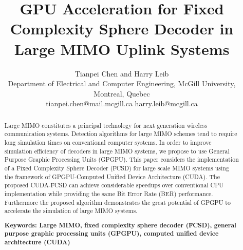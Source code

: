 \documentclass[letterpaper, 10pt, conference]{ieeeconf}
\title{\LARGE \bf GPU Acceleration for Fixed Complexity Sphere Decoder in Large MIMO Uplink Systems}
\author{Tianpei Chen and Harry Leib\\
Department of Electrical and Computer Engineering, McGill University, Montreal, Quebec\\
tianpei.chen@mail.mcgill.ca harry.leib@mcgill.ca}
\begin{document}
\maketitle
\thispagestyle{fancy} %
\lhead{} %
\chead{} %
\rhead{\thepage} %
\lfoot{} %
\cfoot{} %
\rfoot{} %
\renewcommand{\headrulewidth}{0pt} %
\renewcommand{\footrulewidth}{0pt} %
\pagestyle{fancy}  
\rhead{\thepage}
\begin{abstract}
Large MIMO constitutes a principal technology for next generation wireless communication systems. Detection algorithms for large MIMO schemes tend to require long simulation times on conventional computer systems. In order to improve simulation efficiency of decoders in large MIMO systems, we propose to use General Purpose Graphic Processing Units (GPGPU). This paper considers the implementation of a Fixed Complexity Sphere Decoder (FCSD) for large scale MIMO systems using the framework of GPGPU-Computed Unified Device Architecture (CUDA). The proposed CUDA-FCSD can achieve considerable speedups over conventional CPU implementation while providing the same Bit Error Rate (BER) performance. Furthermore the proposed algorithm demonstrates the great potential of GPGPU to accelerate the simulation of large MIMO systems.

\textbf{ Keywords: Large MIMO, fixed complexity sphere decoder (FCSD), general purpose graphic processing units (GPGPU), computed unified device architecture (CUDA)}
\end{abstract}





%
\end{document}
